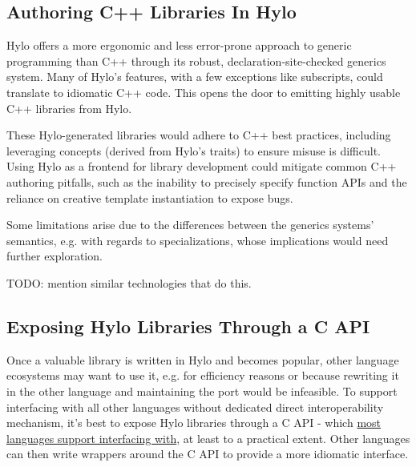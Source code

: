 \subsection{Authoring C++ Libraries In Hylo}
Hylo offers a more ergonomic and less error-prone approach to generic programming than C++ through its robust, declaration-site-checked generics system. Many of Hylo's features, with a few exceptions like subscripts, could translate to idiomatic C++ code. This opens the door to emitting highly usable C++ libraries from Hylo.

These Hylo-generated libraries would adhere to C++ best practices, including leveraging concepts (derived from Hylo's traits) to ensure misuse is difficult. Using Hylo as a frontend for library development could mitigate common C++ authoring pitfalls, such as the inability to precisely specify function APIs and the reliance on creative template instantiation to expose bugs.

Some limitations arise due to the differences between the generics systems' semantics, e.g. with regards to specializations, whose implications would need further exploration.

TODO: mention similar technologies that do this.

\subsection{Exposing Hylo Libraries Through a C API}

Once a valuable library is written in Hylo and becomes popular, other language ecosystems may want to use it, e.g. for efficiency reasons or because rewriting it in the other language and maintaining the port would be infeasible. To support interfacing with all other languages without dedicated direct interoperability mechanism, it's best to expose Hylo libraries through a C API - which \href{https://arxiv.org/abs/2411.08388}{most languages support interfacing with}, at least to a practical extent. Other languages can then write wrappers around the C API to provide a more idiomatic interface.


